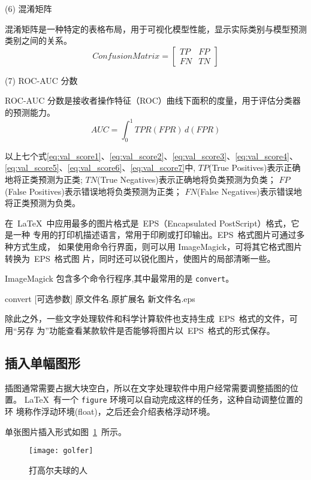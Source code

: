 (6) 混淆矩阵\par
混淆矩阵是一种特定的表格布局，用于可视化模型性能，显示实际类别与模型预测类别之间的关系。
\begin{equation}
  \label{eq:val_score6}
  Confusion Matrix = \begin{bmatrix} TP & FP \\ FN & TN \end{bmatrix}
\end{equation}

(7) ROC-AUC 分数\par
ROC-AUC 分数是接收者操作特征（ROC）曲线下面积的度量，用于评估分类器的预测能力。
\begin{equation}
  \label{eq:val_score7}
  AUC = \int_{0}^{1} TPR(FPR) \, d(FPR)
\end{equation}

以上七个式\ref{eq:val_score1}、\ref{eq:val_score2}、\ref{eq:val_score3}、\ref{eq:val_score4}、\ref{eq:val_score5}、\ref{eq:val_score6}、\ref{eq:val_score7}中,
  $TP$(True Positives)表示正确地将正类预测为正类;
  $TN$(True Negatives)表示正确地将负类预测为负类；
  $FP$(False Positives)表示错误地将负类预测为正类；
  $FN$(False Negatives)表示错误地将正类预测为负类。


在~\LaTeX~中应用最多的图片格式是~EPS（Encapsulated PostScript）格式，它是一种
专用的打印机描述语言，常用于印刷或打印输出。EPS~格式图片可通过多种方式生成，
如果使用命令行界面，则可以用 ImageMagick，可将其它格式图片转换为~EPS~格式图
片，同时还可以锐化图片，使图片的局部清晰一些。

ImageMagick 包含多个命令行程序,其中最常用的是 \texttt{convert}。
\begin{shell}
convert [可选参数] 原文件名.原扩展名 新文件名.eps
\end{shell}

除此之外，一些文字处理软件和科学计算软件也支持生成~EPS~格式的文件，可用“另存
为”功能查看某款软件是否能够将图片以~EPS~格式的形式保存。

\subsection{插入单幅图形}

插图通常需要占据大块空白，所以在文字处理软件中用户经常需要调整插图的位置。
\LaTeX~有一个 \texttt{figure} 环境可以自动完成这样的任务，这种自动调整位置的环
境称作浮动环境(float)，之后还会介绍表格浮动环境。

单张图片插入形式如图~\ref{fig:golfer}~所示。
\begin{figure}[htbp]
\centering
\texttt{[image: golfer]}
\caption{打高尔夫球的人}
\label{fig:golfer}
\end{figure}

